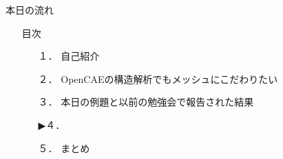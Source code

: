 \begin{frame}{本日の流れ}
  \begin{itemize}
      \item[] 目次
      \begin{itemize}[itemsep=1.3ex, leftmargin=1cm]
        \item[１．] {\color{cud_lightgray} 自己紹介}
        \item[２．] {\color{cud_lightgray} OpenCAEの構造解析でもメッシュにこだわりたい}
        \item[３．] {\color{cud_lightgray} 本日の例題と以前の勉強会で報告された結果}
        \item[▶４．] 
        \item[５．] まとめ
      \end{itemize}
  \end{itemize}
\end{frame}
